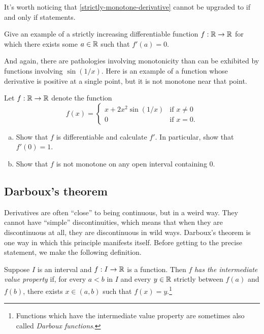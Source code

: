 It's worth noticing that \cref{strictly-monotone-derivative} cannot be upgraded to if and only if statements. 

\begin{exercise}
	Give an example of a strictly increasing differentiable function $f : \mathbb{R} \to \mathbb{R}$ for which there exists some $a \in \mathbb{R}$ such that $f'(a) = 0$. 
\end{exercise}

And again, there are pathologies involving monotonicity than can be exhibited by functions involving $\sin(1/x)$. Here is an example of a function whose derivative is positive at a single point, but it is not monotone near that point. 

\begin{exercise} \label{positive-not-monotone}
	Let $f : \mathbb{R} \to \mathbb{R}$ denote the function
	\[ f(x) = \begin{cases} x + 2x^2 \sin(1/x) & \text{if } x \neq 0 \\ 0 & \text{if } x = 0. \end{cases} \]
	\begin{enumerate}[(a)]
		\item Show that $f$ is differentiable and calculate $f'$. In particular, show that $f'(0) = 1$. 
		\item Show that $f$ is not monotone on any open interval containing 0.  
	\end{enumerate}
\end{exercise}

\subsection{Darboux's theorem \starred} \label{darboux-section}

Derivatives are often ``close'' to being continuous, but in a weird way. They cannot have ``simple'' discontinuities, which means that when they are discontinuous at all, they are discontinuous in wild ways. Darboux's theorem is one way in which this principle manifests itself. Before getting to the precise statement, we make the following definition. 

\begin{definition} 
	Suppose $I$ is an interval and $f : I \to \mathbb{R}$ is a function. Then $f$ \emph{has the intermediate value property} if, for every $a < b$ in $I$ and every $y \in \mathbb{R}$ strictly between $f(a)$ and $f(b)$, there exists $x \in (a, b)$ such that $f(x) = y$.\footnote{Functions which have the intermediate value property are sometimes also called \emph{Darboux functions}.} 
\end{definition}

